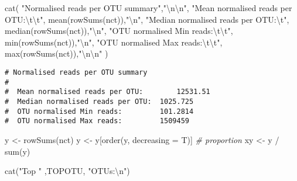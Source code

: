 \documentclass[
]{article}
\newenvironment{Shaded}{\begin{snugshade}}{\end{snugshade}}
\newcommand{\AttributeTok}[1]{\textcolor[rgb]{0.77,0.63,0.00}{#1}}
\newcommand{\CommentTok}[1]{\textcolor[rgb]{0.56,0.35,0.01}{\textit{#1}}}
\newcommand{\FunctionTok}[1]{\textcolor[rgb]{0.00,0.00,0.00}{#1}}
\newcommand{\NormalTok}[1]{#1}
\newcommand{\OtherTok}[1]{\textcolor[rgb]{0.56,0.35,0.01}{#1}}
\newcommand{\SpecialCharTok}[1]{\textcolor[rgb]{0.00,0.00,0.00}{#1}}
\newcommand{\StringTok}[1]{\textcolor[rgb]{0.31,0.60,0.02}{#1}}
\begin{document}
\begin{Shaded}
\begin{Highlighting}[]
\FunctionTok{cat}\NormalTok{(}
  \StringTok{"Normalised reads per OTU summary"}\NormalTok{,}\StringTok{"}\SpecialCharTok{\textbackslash{}n\textbackslash{}n}\StringTok{"}\NormalTok{,}
  \StringTok{"Mean normalised reads per OTU:}\SpecialCharTok{\textbackslash{}t\textbackslash{}t}\StringTok{"}\NormalTok{, }\FunctionTok{mean}\NormalTok{(}\FunctionTok{rowSums}\NormalTok{(nct)),}\StringTok{"}\SpecialCharTok{\textbackslash{}n}\StringTok{"}\NormalTok{,}
  \StringTok{"Median normalised reads per OTU:}\SpecialCharTok{\textbackslash{}t}\StringTok{"}\NormalTok{, }\FunctionTok{median}\NormalTok{(}\FunctionTok{rowSums}\NormalTok{(nct)),}\StringTok{"}\SpecialCharTok{\textbackslash{}n}\StringTok{"}\NormalTok{,}
  \StringTok{"OTU normalised Min reads:}\SpecialCharTok{\textbackslash{}t\textbackslash{}t}\StringTok{"}\NormalTok{, }\FunctionTok{min}\NormalTok{(}\FunctionTok{rowSums}\NormalTok{(nct)),}\StringTok{"}\SpecialCharTok{\textbackslash{}n}\StringTok{"}\NormalTok{,}
  \StringTok{"OTU normalised Max reads:}\SpecialCharTok{\textbackslash{}t\textbackslash{}t}\StringTok{"}\NormalTok{, }\FunctionTok{max}\NormalTok{(}\FunctionTok{rowSums}\NormalTok{(nct)),}\StringTok{"}\SpecialCharTok{\textbackslash{}n\textbackslash{}n}\StringTok{"}
\NormalTok{)}
\end{Highlighting}
\end{Shaded}

\begin{verbatim}
# Normalised reads per OTU summary 
# 
#  Mean normalised reads per OTU:        12531.51 
#  Median normalised reads per OTU:  1025.725 
#  OTU normalised Min reads:         101.2814 
#  OTU normalised Max reads:         1509459
\end{verbatim}

\begin{Shaded}
\begin{Highlighting}[]
\NormalTok{y }\OtherTok{\textless{}{-}} \FunctionTok{rowSums}\NormalTok{(nct)}
\NormalTok{y }\OtherTok{\textless{}{-}}\NormalTok{ y[}\FunctionTok{order}\NormalTok{(y, }\AttributeTok{decreasing =}\NormalTok{ T)]}
\CommentTok{\# proportion}
\NormalTok{xy }\OtherTok{\textless{}{-}}\NormalTok{ y }\SpecialCharTok{/} \FunctionTok{sum}\NormalTok{(y)}

\FunctionTok{cat}\NormalTok{(}\StringTok{"Top "}\NormalTok{ ,TOPOTU, }\StringTok{"OTUs:}\SpecialCharTok{\textbackslash{}n}\StringTok{"}\NormalTok{)}
\end{Highlighting}
\end{Shaded}
\end{document}
